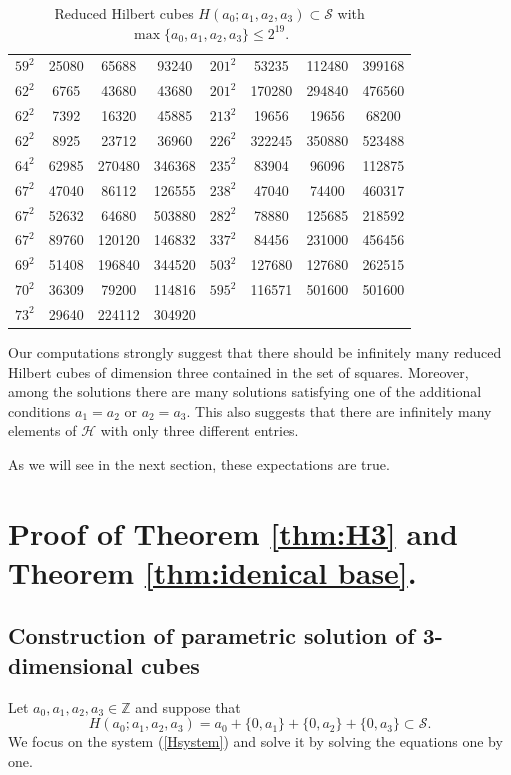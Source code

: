 \documentclass[10pt]{amsart}
\theoremstyle{plain}
\def\cal{\mathcal}
\def\bbb{\mathbb}
\def\op{\operatorname}
\newcommand{\Z}{\bbb{Z}}
\begin{document}
\begin{table}[htbp]
\begin{tabular}{|c|c|c|c||c|c|c|c|}
 $59^2$ & 25080 & 65688 & 93240 & $201^2$ & 53235 & 112480 & 399168 \\
 $62^2$ & 6765 & 43680 & 43680 & $201^2$ & 170280 & 294840 & 476560 \\
 $62^2$ & 7392 & 16320 & 45885 & $213^2$ & 19656 & 19656 & 68200 \\
 $62^2$ & 8925 & 23712 & 36960 & $226^2$ & 322245 & 350880 & 523488 \\
 $64^2$ & 62985 & 270480 & 346368 & $235^2$ & 83904 & 96096 & 112875 \\
 $67^2$ & 47040 & 86112 & 126555 & $238^2$ & 47040 & 74400 & 460317 \\
 $67^2$ & 52632 & 64680 & 503880 & $282^2$ & 78880 & 125685 & 218592 \\
 $67^2$ & 89760 & 120120 & 146832 & $337^2$ & 84456 & 231000 & 456456 \\
 $69^2$ & 51408 & 196840 & 344520 & $503^2$ & 127680 & 127680 & 262515 \\
 $70^2$ & 36309 & 79200 & 114816 & $595^2$ & 116571 & 501600 & 501600 \\
 $73^2$ & 29640 & 224112 & 304920 &  &  &  &  \\
 \hline
\end{tabular}
\caption{Reduced Hilbert cubes $H(a_{0}; a_{1}, a_{2}, a_{3})\subset \cal{S}$ with $\op{max}\{a_{0}, a_{1}, a_{2}, a_{3}\}\leq 2^{19}.$ }  
\end{table}
\bigskip
Our computations strongly suggest that there should be infinitely many reduced Hilbert cubes of dimension three contained in the set of squares. Moreover, among the solutions there are many solutions satisfying one of the additional conditions $a_{1}=a_{2}$ or $a_{2}=a_{3}$. This also suggests that there are infinitely many elements of $\cal{H}$ with only three different entries. 

As we will see in the next section, these expectations are true.

\section{Proof of Theorem \ref{thm:H3} and
Theorem  \ref{thm:idenical base}. }

\subsection{Construction of parametric solution of 3-dimensional cubes}
Let $a_{0}, a_{1}, a_{2}, a_{3}\in\Z$ and suppose that
$$
H(a_{0}; a_{1}, a_{2}, a_{3})=a_{0}+\{0, a_{1}\}+\{0, a_{2}\}+\{0, a_{3}\}\subset \cal{S}.
$$
We focus on the system (\ref{Hsystem}) and solve it by solving the equations one by one.
\end{document}
